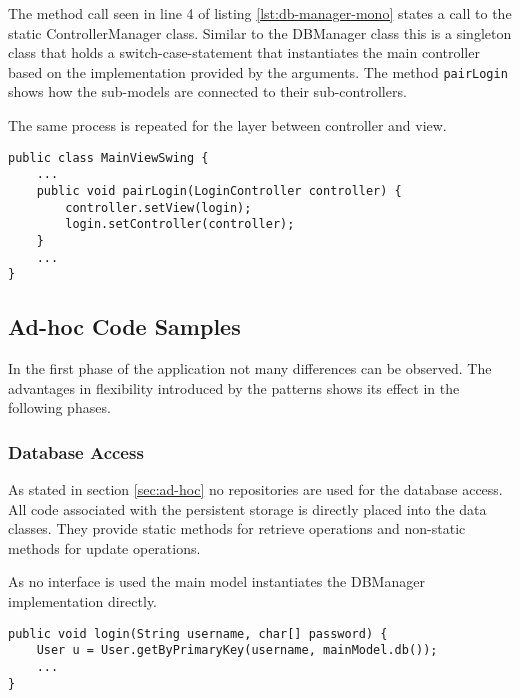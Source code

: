 The method call seen in line 4 of listing \ref{lst:db-manager-mono} states a call to the static ControllerManager class. Similar to the DBManager class this is a singleton class that holds a switch-case-statement that instantiates the main controller based on the implementation provided by the arguments. The method \texttt{pairLogin} shows how the sub-models are connected to their sub-controllers. 

\clearpage

The same process is repeated for the layer between controller and view. 

\begin{lstlisting}[caption={[Code snipped showing pairing code between a sub-controller and a sub-view.]Code snipped showing pairing code between a sub-controller and a sub-view. The pairing between the model and controller layer works in a very similar way.}, captionpos=b, label={lst:pairing}]
public class MainViewSwing {
	...
	public void pairLogin(LoginController controller) {
		controller.setView(login);
		login.setController(controller);
	}
	...
}
\end{lstlisting}
   
\subsection{Ad-hoc Code Samples}
In the first phase of the application not many differences can be observed. The advantages in flexibility introduced by the patterns shows its effect in the following phases. 

\subsubsection{Database Access}
As stated in section \ref{sec:ad-hoc} no repositories are used for the database access. All code associated with the persistent storage is directly placed into the data classes. They provide static methods for retrieve operations and non-static methods for update operations. 

As no interface is used the main model instantiates the DBManager implementation directly. 

\begin{lstlisting}[caption={[Code snipped showing database access in the ad-hoc program version. ]Code snipped showing database access in the ad-hoc program version. All database code is placed into the corresponding data class, retrieval methods are static and take the corresponding DBManager as parameter. The reference to the DBManager is provided by a getter method of the main model, as in listing \ref{lst:db-access-bp}.}, captionpos=b]
public void login(String username, char[] password) {
	User u = User.getByPrimaryKey(username, mainModel.db()); 
	...
}
\end{lstlisting}

